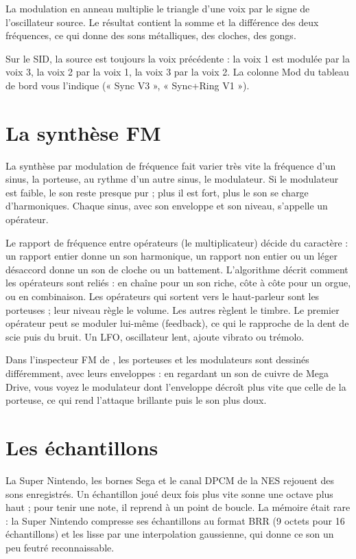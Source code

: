 La modulation en anneau multiplie le triangle d'une voix par le signe de l'oscillateur source. Le résultat contient
la somme et la différence des deux fréquences, ce qui donne des sons métalliques, des cloches, des gongs.

Sur le SID, la source est toujours la voix précédente : la voix 1 est modulée par la voix 3, la voix 2 par la voix
1, la voix 3 par la voix 2. La colonne Mod du tableau de bord vous l'indique (« Sync V3 », « Sync+Ring V1 »).

\section{La synthèse FM}
La synthèse par modulation de fréquence fait varier très vite la fréquence d'un sinus, la porteuse, au rythme d'un
autre sinus, le modulateur. Si le modulateur est faible, le son reste presque pur ; plus il est fort, plus le son se
charge d'harmoniques. Chaque sinus, avec son enveloppe et son niveau, s'appelle un opérateur.

Le rapport de fréquence entre opérateurs (le multiplicateur) décide du caractère : un rapport entier donne un son
harmonique, un rapport non entier ou un léger désaccord donne un son de cloche ou un battement. L'algorithme décrit
comment les opérateurs sont reliés : en chaîne pour un son riche, côte à côte pour un orgue, ou en combinaison. Les
opérateurs qui sortent vers le haut-parleur sont les porteuses ; leur niveau règle le volume. Les autres règlent le
timbre. Le premier opérateur peut se moduler lui-même (feedback), ce qui le rapproche de la dent de scie puis du
bruit. Un LFO, oscillateur lent, ajoute vibrato ou trémolo.

Dans l'inspecteur FM de \soft, les porteuses et les modulateurs sont dessinés différemment, avec leurs enveloppes :
en regardant un son de cuivre de Mega Drive, vous voyez le modulateur dont l'enveloppe décroît plus vite que celle de
la porteuse, ce qui rend l'attaque brillante puis le son plus doux.

\section{Les échantillons}
La Super Nintendo, les bornes Sega et le canal DPCM de la NES rejouent des sons enregistrés. Un échantillon joué deux
fois plus vite sonne une octave plus haut ; pour tenir une note, il reprend à un point de boucle. La mémoire était
rare : la Super Nintendo compresse ses échantillons au format BRR (9 octets pour 16 échantillons) et les lisse par une
interpolation gaussienne, qui donne ce son un peu feutré reconnaissable.

